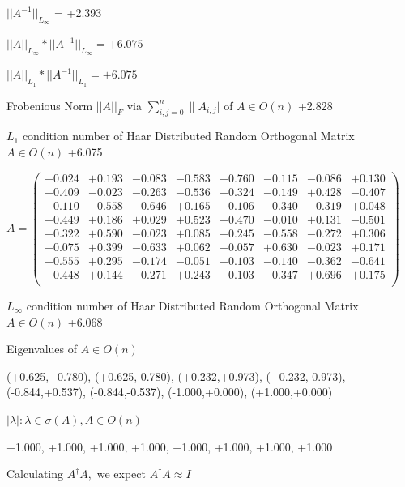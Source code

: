 \documentclass[9pt]{article}
\theoremstyle{plain}
\theoremstyle{definition}
\theoremstyle{remark}
\numberwithin{equation}{section}
\begin{document}
$||A^{-1}||_{L_{\infty}}$ = +2.393

$||A||_{L_{\infty}} * ||A^{-1}||_{L_{\infty}} = +6.075$

$||A||_{L_1} * ||A^{-1}||_{L_1} = +6.075$

Frobenious Norm  $||A||_{\textit{F}}$ via $\sum\limits_{i,j =0}^{n} \|A_{i,j}|$   of  $A \in O(n)$  +2.828

$L_1$ condition number of Haar Distributed Random Orthogonal Matrix $A \in O(n)$ +6.075

$A = \left(
\begin{array}{
cccccccc}
-0.024 & +0.193 & -0.083 & -0.583 & +0.760 & -0.115 & -0.086 & +0.130 \\
+0.409 & -0.023 & -0.263 & -0.536 & -0.324 & -0.149 & +0.428 & -0.407 \\
+0.110 & -0.558 & -0.646 & +0.165 & +0.106 & -0.340 & -0.319 & +0.048 \\
+0.449 & +0.186 & +0.029 & +0.523 & +0.470 & -0.010 & +0.131 & -0.501 \\
+0.322 & +0.590 & -0.023 & +0.085 & -0.245 & -0.558 & -0.272 & +0.306 \\
+0.075 & +0.399 & -0.633 & +0.062 & -0.057 & +0.630 & -0.023 & +0.171 \\
-0.555 & +0.295 & -0.174 & -0.051 & -0.103 & -0.140 & -0.362 & -0.641 \\
-0.448 & +0.144 & -0.271 & +0.243 & +0.103 & -0.347 & +0.696 & +0.175 \\
\end{array}
\right)$ \newline 

$L_{\infty}$ condition number of Haar Distributed Random Orthogonal Matrix $A \in O(n)$ +6.068

Eigenvalues of $A \in O(n)$

(+0.625,+0.780), (+0.625,-0.780), (+0.232,+0.973), (+0.232,-0.973), (-0.844,+0.537), (-0.844,-0.537), (-1.000,+0.000), (+1.000,+0.000)

 $|\lambda | : \lambda \in \sigma(A) , A \in O(n)$

+1.000, +1.000, +1.000, +1.000, +1.000, +1.000, +1.000, +1.000


Calculating $A^{\dag} A,$  we expect $A^{\dag} A \approx I$
\end{document}
